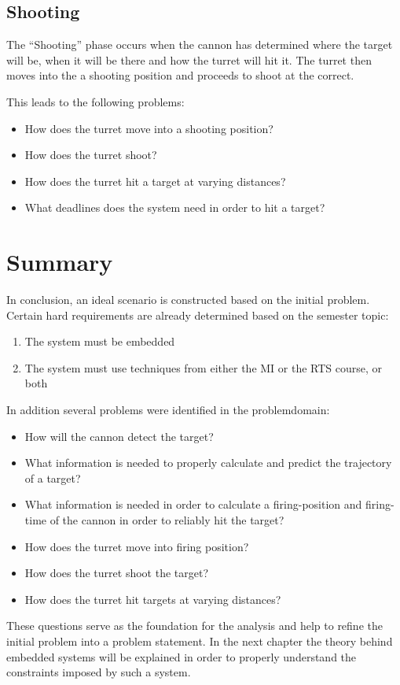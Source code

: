 \subsection{Shooting}
The ``Shooting'' phase occurs when the cannon has determined where the target
will be, when it will be there and how the turret will hit it. The turret then moves
into the a shooting position and proceeds to shoot at the correct.\nl

This leads to the following problems:
\begin{itemize}
  \item How does the turret move into a shooting position?
  \item How does the turret shoot?
  \item How does the turret hit a target at varying distances?
  \item What deadlines does the system need in order to hit a target?
\end{itemize}

\section{Summary}
In conclusion, an ideal scenario is constructed based on the initial problem.
Certain hard requirements are already determined based on the semester
topic:
\begin{enumerate}
	\item The system must be embedded
	\item The system must use techniques from either the MI or the RTS course, or both
\end{enumerate}

In addition several problems were identified in the problemdomain:
\begin{itemize}
	\item How will the cannon detect the target?
	\item What information is needed to properly calculate and predict the
	trajectory of a target?
	\item What information is needed in order to calculate a firing-position and
	firing-time of the cannon in order to reliably hit the target?
	\item How does the turret move into firing position?
	\item How does the turret shoot the target?
	\item How does the turret hit targets at varying distances?
\end{itemize}

These questions serve as the foundation for the analysis and help to
refine the initial problem into a problem statement. In the next chapter the
theory behind embedded systems will be explained in order to properly
understand the constraints imposed by such a system.

